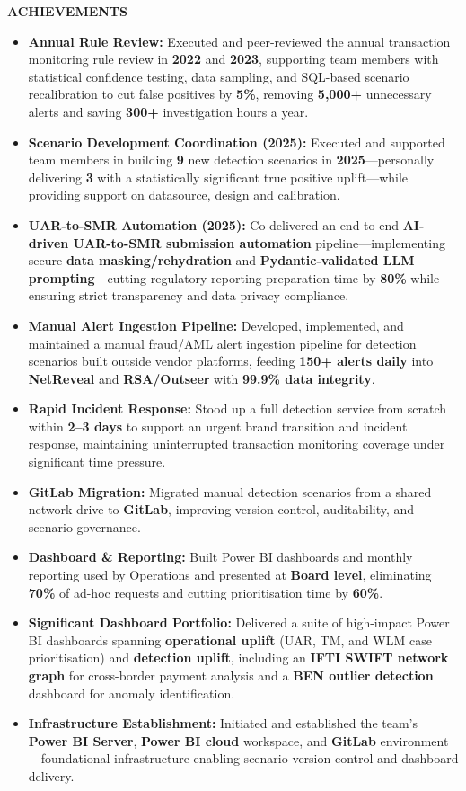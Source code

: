 \documentclass[11pt,a4paper]{article}
\begin{document}
\begin{mdframed}[style=dashedleft]
\textbf{ACHIEVEMENTS}
\begin{itemize}[leftmargin=1.5em, itemsep=4pt]
    \item \textbf{Annual Rule Review:} Executed and peer-reviewed the annual transaction monitoring rule review in \textbf{2022} and \textbf{2023}, supporting team members with statistical confidence testing, data sampling, and SQL-based scenario recalibration to cut false positives by \textbf{5\%}, removing \textbf{5,000+} unnecessary alerts and saving \textbf{300+} investigation hours a year.
    \item \textbf{Scenario Development Coordination (2025):} Executed and supported team members in building \textbf{9} new detection scenarios in \textbf{2025}—personally delivering \textbf{3} with a statistically significant true positive uplift—while providing support on datasource, design and calibration.
    \item \textbf{UAR-to-SMR Automation (2025):} Co-delivered an end-to-end \textbf{AI-driven UAR-to-SMR submission automation} pipeline—implementing secure \textbf{data masking/rehydration} and \textbf{Pydantic-validated LLM prompting}—cutting regulatory reporting preparation time by \textbf{80\%} while ensuring strict transparency and data privacy compliance.
    \item \textbf{Manual Alert Ingestion Pipeline:} Developed, implemented, and maintained a manual fraud/AML alert ingestion pipeline for detection scenarios built outside vendor platforms, feeding \textbf{150+ alerts daily} into \textbf{NetReveal} and \textbf{RSA/Outseer} with \textbf{99.9\% data integrity}.
    \item \textbf{Rapid Incident Response:} Stood up a full detection service from scratch within \textbf{2--3 days} to support an urgent brand transition and incident response, maintaining uninterrupted transaction monitoring coverage under significant time pressure.
    \item \textbf{GitLab Migration:} Migrated manual detection scenarios from a shared network drive to \textbf{GitLab}, improving version control, auditability, and scenario governance.
    \item \textbf{Dashboard \& Reporting:} Built Power BI dashboards and monthly reporting used by Operations and presented at \textbf{Board level}, eliminating \textbf{70\%} of ad-hoc requests and cutting prioritisation time by \textbf{60\%}.
    \item \textbf{Significant Dashboard Portfolio:} Delivered a suite of high-impact Power BI dashboards spanning \textbf{operational uplift} (UAR, TM, and WLM case prioritisation) and \textbf{detection uplift}, including an \textbf{IFTI SWIFT network graph} for cross-border payment analysis and a \textbf{BEN outlier detection} dashboard for anomaly identification.
    \item \textbf{Infrastructure Establishment:} Initiated and established the team's \textbf{Power BI Server}, \textbf{Power BI cloud} workspace, and \textbf{GitLab} environment—foundational infrastructure enabling scenario version control and dashboard delivery.
\end{itemize}


\end{mdframed}
\end{document}
